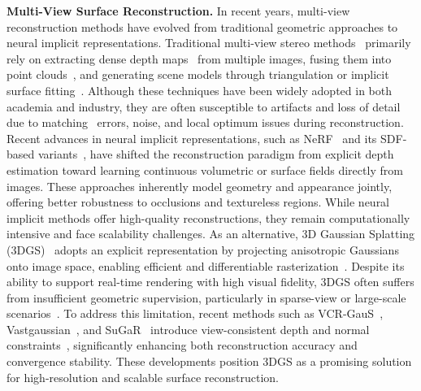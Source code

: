 \vspace{0.5em}

\textbf{Multi-View Surface Reconstruction.} 
In recent years, multi-view reconstruction methods have evolved from traditional geometric approaches to neural implicit representations. Traditional multi-view stereo methods~\cite{re_MVS1,re_MVS2,re_MVS3,re_MVS4,re_MVS5,re_MVS6} primarily rely on extracting dense depth maps~\cite{re_depth1,re_depth2} from multiple images, fusing them into point clouds~\cite{re_point,re_point2}, and generating scene models through triangulation or implicit surface fitting~\cite{re_fit}. Although these techniques have been widely adopted in both academia and industry, they are often susceptible to artifacts and loss of detail due to matching~\cite{re_matching1} errors, noise, and local optimum issues during reconstruction. 
Recent advances in neural implicit representations, such as NeRF~\cite{re_nerf} and its SDF-based variants~\cite{NeuS,MonoSDF}, have shifted the reconstruction paradigm from explicit depth estimation toward learning continuous volumetric or surface fields directly from images. These approaches inherently model geometry and appearance jointly, offering better robustness to occlusions and textureless regions.
While neural implicit methods offer high-quality reconstructions, they remain computationally intensive and face scalability challenges. As an alternative, 3D Gaussian Splatting (3DGS)~\cite{3dgs} adopts an explicit representation by projecting anisotropic Gaussians onto image space, enabling efficient and differentiable rasterization~\cite{yifan2019differentiable}. Despite its ability to support real-time rendering with high visual fidelity, 3DGS often suffers from insufficient geometric supervision, particularly in sparse-view or large-scale scenarios~\cite{neusg}. To address this limitation, recent methods such as VCR-GauS~\cite{vcr-gaus}, Vastgaussian~\cite{vast}, and SuGaR~\cite{SuGaR} introduce view-consistent depth and normal constraints~\cite{turkulainen2024dnsplatter,bae2024dsine,yin2019enforcing}, significantly enhancing both reconstruction accuracy and convergence stability. These developments position 3DGS as a promising solution for high-resolution and scalable surface reconstruction.

